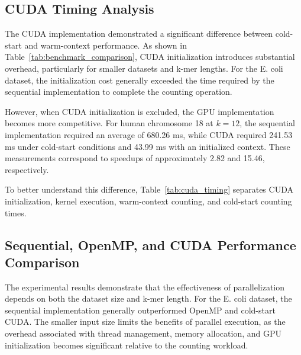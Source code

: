 \documentclass{article}
\begin{document}
\vspace{\baselineskip}

\subsection{CUDA Timing Analysis}

\vspace{\baselineskip}

The CUDA implementation demonstrated a significant difference between cold-start and warm-context performance.
As shown in Table~\ref{tab:benchmark_comparison}, CUDA initialization introduces substantial overhead,
particularly for smaller datasets and k-mer lengths. For the E. coli dataset, the initialization cost
generally exceeded the time required by the sequential implementation to complete the counting operation.

\vspace{\baselineskip}

However, when CUDA initialization is excluded, the GPU implementation becomes more competitive.
For human chromosome 18 at $k=12$, the sequential implementation required an average of 680.26 ms,
while CUDA required 241.53 ms under cold-start conditions and 43.99 ms with an initialized context.
These measurements correspond to speedups of approximately 2.82 and 15.46, respectively.

\vspace{\baselineskip}

To better understand this difference, Table~\ref{tab:cuda_timing} separates CUDA initialization,
kernel execution, warm-context counting, and cold-start counting times.

\vspace{\baselineskip}



\vspace{\baselineskip}

\subsection{Sequential, OpenMP, and CUDA Performance Comparison}

\vspace{\baselineskip}

The experimental results demonstrate that the effectiveness of parallelization depends on both the
dataset size and k-mer length. For the E. coli dataset, the sequential implementation generally
outperformed OpenMP and cold-start CUDA. The smaller input size limits the benefits of parallel
execution, as the overhead associated with thread management, memory allocation, and GPU
initialization becomes significant relative to the counting workload.
\end{document}
